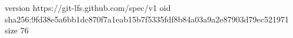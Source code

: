version https://git-lfs.github.com/spec/v1
oid sha256:9fd38e5a6bb1dc870f7a1eab15b7f5335fdf8b84a03a9a2e87903d79ec521971
size 76
